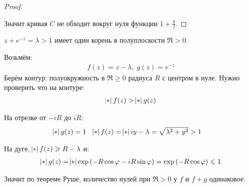 \begin{proof}
\begin{center}
    \end{center}

    Значит кривая $C$ не обходит вокруг нуля функции $1 + \frac gf$.
\end{proof}

\begin{example}
    $z + e^{-z} = \lambda > 1$ имеет один корень в
    полуплоскости $\Re > 0$.

    Возьмём: 
    \begin{gather*}
        f(z) = z - \lambda, \; g(z) = e^{-z}
    \end{gather*}
    Берём контур: полуокружность в $\Re \ge 0$
    радиуса $R$ с центром в нуле. Нужно проверить что
    на контуре: 
    \begin{gather*}
        \abs{f(z)} > \abs{g(z)}
    \end{gather*}

    На отрезке от $-iR$ до $iR$: 
    \begin{align*}
        \abs{g(z)} &= 1 & \abs{f(z)} &= \abs{iy - \lambda} = \sqrt{\lambda^2 + y^2} > 1
    \end{align*}

    На дуге, $\abs{f(z)} \ge R - \lambda$ и: 
    \begin{gather*}
        \abs{g(z)} = \abs{\exp \left(-R\cos \varphi -iR\sin \varphi\right) }
        = \exp\left(-R\cos\varphi\right) \le 1
    \end{gather*}
    
    Значит по теореме Руше, количество нулей при $\Re > 0$
    у $f$ и $f+g$ одинаковое.
\end{example}

\newpage
